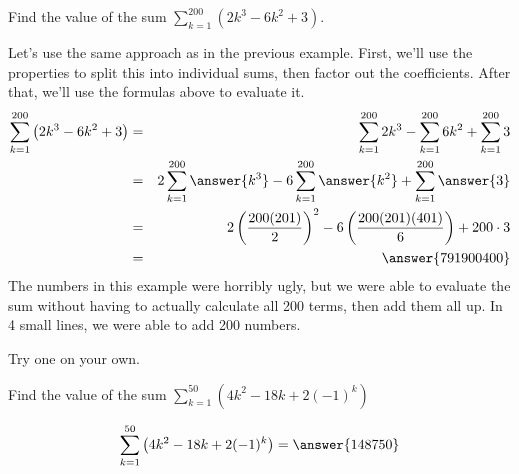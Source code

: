 \documentclass[12pt]{ximera}
\theoremstyle{definition}
\newcommand{\hop}{\vskip 0.18in}
\begin{document}
\begin{example}
	Find the value of the sum $\displaystyle \sum_{k=1}^{200} \left(2k^3-6k^2+3\right)$.
	\begin{explanation}
		Let's use the same approach as in the previous example.  First, we'll use the properties to split this into individual sums, then factor out the coefficients.  
		After that, we'll use the formulas above to evaluate it.
		\begin{eqnarray*}
			\sum_{k=1}^{200} \left(2k^3-6k^2+3\right) &=& \sum_{k=1}^{200} 2k^3 - \sum_{k=1}^{200} 6k^2 + \sum_{k=1}^{200}3\\
				&=& 2 \sum_{k=1}^{200} \answer{k^3} - 6 \sum_{k=1}^{200} \answer{k^2} + \sum_{k=1}^{200}\answer{3}\\
				&=& 2 \left( \frac{200(201)}{2}\right)^2 - 6 \left( \frac{200(201)(401)}{6}\right) + 200 \cdot 3\\
				&=& \answer{791900400}
		\end{eqnarray*}
	The numbers in this example were horribly ugly, but we were able to evaluate the sum without having to actually calculate all 200 terms, then add them all up.
	In 4 small lines, we were able to add 200 numbers.
	
	\end{explanation}
\end{example}

\hop

Try one on your own.
\begin{problem}
	Find the value of the sum $\displaystyle \sum_{k=1}^{50} \left( 4k^2-18k + 2(-1)^k \right)$
	
	\[ \sum_{k=1}^{50} \left( 4k^2 - 18k + 2(-1)^k \right) = \answer{148750} \]
\end{problem}
\end{document}
